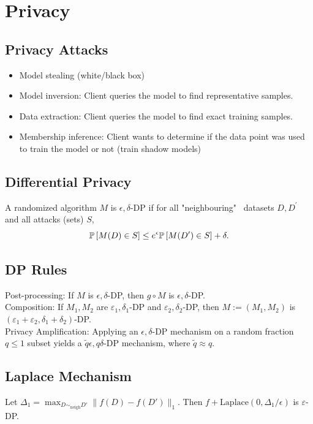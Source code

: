 \section{Privacy}
\subsection*{Privacy Attacks}
\begin{itemize}
    \item Model stealing (white/black box)
    \item Model inversion: Client queries the model to find representative samples.
    \item Data extraction: Client queries the model to find exact training samples.
    \item Membership inference: Client wants to determine if the data
          point was used to train the model or not (train shadow models)
\end{itemize}

\subsection*{Differential Privacy}
A randomized algorithm $M$ is $\epsilon, \delta$-DP if for all "neighbouring" \ datasets $D, D^\prime$ and all attacks (sets) $S$,
$$\P\left[M(D)\in S\right] \le e^\epsilon \P\left[M(D^\prime)\in S\right]+\delta.$$
\vspace*{-6mm}
\subsection*{DP Rules}
Post-processing: If $M$ is $\epsilon,\delta$-DP, then $g\circ M$ is $\epsilon,\delta$-DP.\\
Composition: If $M_1,M_2$ are $\varepsilon_1,\delta_1$-DP and $\varepsilon_2,\delta_2$-DP, then $M:=(M_1,M_2)$ is $(\varepsilon_1+\varepsilon_2,\delta_1+\delta_2)$-DP.\\
Privacy Amplification: Applying an $\epsilon,\delta$-DP mechanism on a random fraction $q\leq1$ subset yields a $\tilde{q}\epsilon,q\delta$-DP mechanism, where $\tilde{q}\approx q$.

\subsection*{Laplace Mechanism}
Let $\Delta_1=\max_{D\sim_{\text{neigh}}D'}\|f(D)-f(D')\|_{1}$. Then $f+\text{Laplace}(0,\Delta_1/\epsilon)$ is $\varepsilon$-DP.

